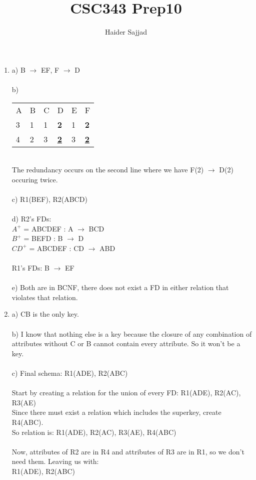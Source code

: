 \documentclass{article}
\begin{document}
\title{CSC343 Prep10}
\author{Haider Sajjad}
\maketitle






\begin{enumerate}
    \item %
    a)
    B $\rightarrow$ EF, F $\rightarrow$ D \\\\
    b) 
    \begin{table}[htp]
\begin{tabular}{llllll}
A & B & C & D & E & F\\
3 & 1 & 1 & \textbf{2}       & 1 & \textbf{2}       \\
4 & 2 & 3 & {\ul \textbf{2}} & 3 & {\ul \textbf{2}}
\end{tabular}
\end{table}
\\
The redundancy occurs on the second line where 
we have F(2) $\rightarrow$ D(2) occuring twice.
\\\\
c) R1(BEF), R2(ABCD)
\\\\
d) R2's FDs:
\\
$A^{+}$ = ABCDEF :
A $\rightarrow$ BCD \\
$B^{+}$ = BEFD : 
B $\rightarrow$ D \\
$CD^{+}$ = ABCDEF : 
CD $\rightarrow$ ABD \\\\
R1's FDs:
B $\rightarrow$ EF\\
\\
e) Both are in BCNF, there does not exist a FD in either relation that violates that relation.
\\
\item %
a) CB is the only key.\\\\
b) I know that nothing else is a key because the closure of any combination of attributes without C or B cannot contain every attribute. So it won't be a key.\\\\
c) Final schema: R1(ADE), R2(ABC)\\
\\
Start by creating a relation for the union of every FD: R1(ADE), R2(AC), R3(AE) \\
Since there must exist a relation which includes the superkey, create R4(ABC).\\
So relation is: R1(ADE), R2(AC), R3(AE), R4(ABC)\\ \\
Now, attributes of R2 are in R4 and attributes of R3 are in R1, so we don't need them. Leaving us with: \\
R1(ADE), R2(ABC)
    
    
    
        
\end{enumerate}

		
\end{document}
